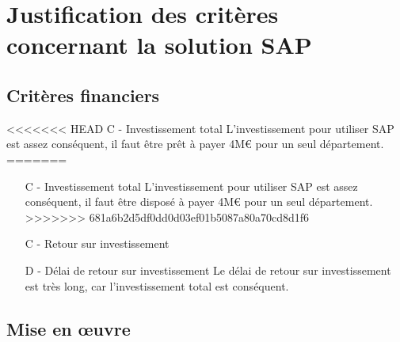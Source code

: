 \section{Justification des critères concernant la solution SAP}

\subsection{Critères financiers}

<<<<<<< HEAD
C - Investissement total
	L'investissement pour utiliser SAP est assez conséquent, il faut être prêt à payer 4M€ pour un seul département.
=======
\begin{itemize}
\item [C -] Investissement total\el
	L'investissement pour utiliser SAP est assez conséquent,
    il faut être disposé à payer 4M€ pour un seul département.
>>>>>>> 681a6b2d5df0dd0d03ef01b5087a80a70cd8d1f6
	
\item [C -] Retour sur investissement
		
\item [D -] Délai de retour sur investissement\el
	Le délai de retour sur investissement est très long,
    car l'investissement total est conséquent.
\end{itemize}

\subsection{Mise en \oe{}uvre}

